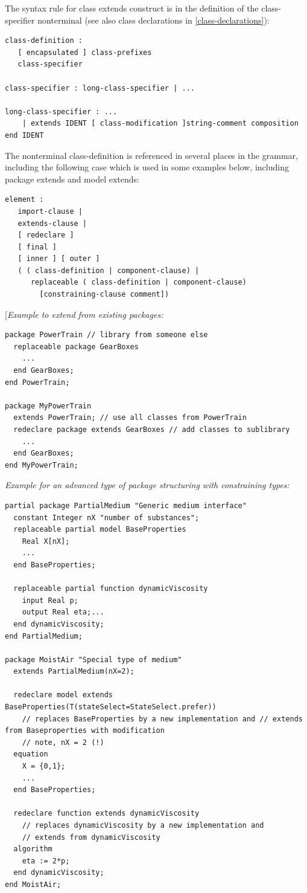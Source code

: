 \documentclass[10pt,a4paper]{report}
\begin{document}
The syntax rule for class extends construct is in the definition of the
class-specifier nonterminal (see also class declarations in \ref{class-declarations}):

\begin{lstlisting}[language=grammar]
class-definition :
   [ encapsulated ] class-prefixes
   class-specifier
   
class-specifier : long-class-specifier | ...

long-class-specifier : ...
    | extends IDENT [ class-modification ]string-comment composition end IDENT
\end{lstlisting}
The nonterminal class-definition is referenced in several places in the
grammar, including the following case which is used in some examples
below, including package extends and model extends:
\begin{lstlisting}[language=grammar]
element :
   import-clause |
   extends-clause |
   [ redeclare ]
   [ final ]
   [ inner ] [ outer ]
   ( ( class-definition | component-clause) |
      replaceable ( class-definition | component-clause)
        [constraining-clause comment])
\end{lstlisting}

{[}\emph{Example to extend from existing packages:}
\begin{lstlisting}[language=modelica]
package PowerTrain // library from someone else
  replaceable package GearBoxes
    ...
  end GearBoxes;
end PowerTrain;

package MyPowerTrain
  extends PowerTrain; // use all classes from PowerTrain
  redeclare package extends GearBoxes // add classes to sublibrary
    ...
  end GearBoxes;
end MyPowerTrain;
\end{lstlisting}

\emph{Example for an advanced type of package structuring with
constraining types:}
\begin{lstlisting}[language=modelica]
partial package PartialMedium "Generic medium interface"
  constant Integer nX "number of substances";
  replaceable partial model BaseProperties
    Real X[nX];
    ...
  end BaseProperties;

  replaceable partial function dynamicViscosity
    input Real p;
    output Real eta;...
  end dynamicViscosity;
end PartialMedium;

package MoistAir "Special type of medium"
  extends PartialMedium(nX=2);
  
  redeclare model extends BaseProperties(T(stateSelect=StateSelect.prefer))
    // replaces BaseProperties by a new implementation and // extends from Baseproperties with modification
    // note, nX = 2 (!)
  equation 
    X = {0,1};
    ...
  end BaseProperties;

  redeclare function extends dynamicViscosity
    // replaces dynamicViscosity by a new implementation and
    // extends from dynamicViscosity
  algorithm 
    eta := 2*p;
  end dynamicViscosity;
end MoistAir;
\end{lstlisting}
\end{document}

